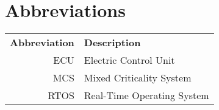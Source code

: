 \chapter*{Abbreviations}
\noindent{}\begin{tabular}{r  l}
\textbf{Abbreviation} 	& \textbf{Description} \vspace{.5em} \\
ECU		&Electric Control Unit\\
MCS		&Mixed Criticality System\\
RTOS	&Real-Time Operating System\\
\end{tabular}